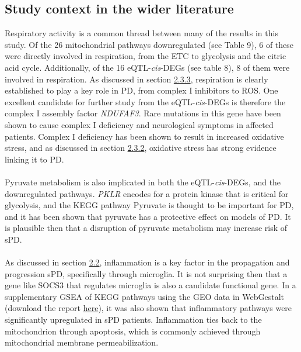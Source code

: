\documentclass{article}
\begin{document}
\subsection{Study context in the wider literature}
\label{subsec:wider}
Respiratory activity is a common thread between many of the results in this study. Of the 26 mitochondrial pathways downregulated (see Table 9), 6 of these were directly involved in respiration, from the ETC to glycolysis and the citric acid cycle. Additionally, of the 16 eQTL-\textit{cis}-DEGs (see table 8), 8 of them were involved in respiration. As discussed in section \hyperref[para:oxidative]{2.3.3}, respiration is clearly established to play a key role in PD, from complex I inhibitors\cite{Langston1983ChronicSynthesis} to ROS\cite{Subramaniam2013MitochondrialDisease}. One excellent candidate for further study from the eQTL-\textit{cis}-DEGs is therefore the complex I assembly factor \textit{NDUFAF3}. Rare mutations in this gene have been shown to cause complex I deficiency\cite{vanderVen2023ExpandingDisease} and neurological symptoms in affected patients. Complex I deficiency has been shown to result in increased oxidative stress\cite{Leman2015AssemblyDeficiency}, and as discussed in section \hyperref[para:oxidative]{2.3.2}, oxidative stress has strong evidence linking it to PD\cite{Subramaniam2013MitochondrialDisease}\cite{Gonzalez-Rodriguez2021DisruptionParkinsonism}.
\\
\\
Pyruvate metabolism is also implicated in both the eQTL-\textit{cis}-DEGs, and the downregulated pathways. \textit{PKLR} encodes for a protein kinase that is critical for glycolysis, and the KEGG pathway  Pyruvate is thought to be important for PD\cite{Gray2014RegulationDisease}, and it has been shown that pyruvate has a protective effect on models of PD\cite{Kim2022PyruvateDisease}. It is plausible then that a disruption of pyruvate metabolism may increase risk of sPD.
\\
\\As discussed in section \hyperref[subsec:inflammation]{2.2}, inflammation is a key factor in the propagation and progression sPD, specifically through microglia\cite{Isik2023MicrogliaDisease}. It is not surprising then that a gene like SOCS3 that regulates microglia\cite{Wang2024SOCS3Macrophages} is also a candidate functional gene. In a supplementary GSEA of KEGG pathways using the GEO data in WebGestalt\cite{Elizarraras2024WebGestaltMulti-omics} (download the report \href{https://github.com/Thomas-brightwell/PD-MSc-project-code/blob/main/Thesis/Supplementary%20materials/KEGG_GSEA.zip}{here}), it was also shown that inflammatory pathways were significantly upregulated in sPD patients. Inflammation ties back to the mitochondrion through apoptosis\cite{Vringer2023MitochondriaInflammation}, which is commonly achieved through mitochondrial membrane permeabilization.
\end{document}
